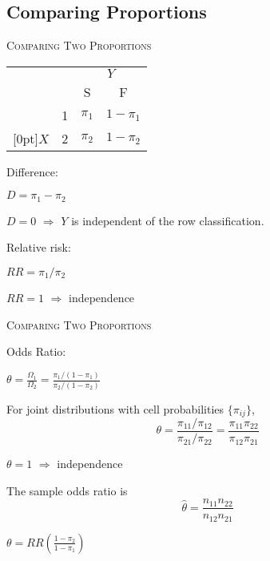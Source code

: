 \documentclass[dvipdfmx, serif,handout]{beamer}
\begin{document}
\subsection{Comparing Proportions}
\begin{frame}{\textsc{Comparing Two Proportions}}

\vspace{-.3cm}
\begin{center}
{\footnotesize
\renewcommand{\arraystretch}{.8}
\begin{tabular}{cccc|} \\
&& \multicolumn{2}{c}{$Y$} \\ 
&  & S & \multicolumn{1}{c}{F} \\ \cline{3-4}
& \multicolumn{1}{c|}{1} & $\pi_1$ & $1-\pi_1$ \\
\raisebox{1.5ex}[0pt]{$X$} & \multicolumn{1}{c|}{2} & $\pi_2$ & $1-\pi_2$ \\ \cline{3-4}
\end{tabular}
}
\end{center}
\benu
\item Difference:
\bi
\item $D=\pi_1-\pi_2$
\item $D=0$ $\Rightarrow$ $Y$ is independent of the row classification.
\ei
\item Relative risk:
\bi
\item $RR = \pi_1/\pi_2$
\item $RR=1$ $\Rightarrow$ independence
\ei
\eenu

\end{frame}
\begin{frame}{\textsc{Comparing Two Proportions}}

\benu
\item[3.] Odds Ratio:
\bi
\item $\theta = \frac{\Omega_1}{\Omega_2}=\frac{\pi_1/(1-\pi_1)}{\pi_2/(1-\pi_2)}$
\item For joint distributions with cell probabilities $\{\pi_{ij}\}$,
$$\theta=\frac{\pi_{11}/\pi_{12}}{\pi_{21}/\pi_{22}}=\frac{\pi_{11}\pi_{22}}{\pi_{12}\pi_{21}}$$
\item $\theta=1$ $\Rightarrow$ independence
\item The sample odds ratio is
$$\hat{\theta} = \frac{n_{11}n_{22}}{n_{12}n_{21}}$$
\item $\theta=RR \left(\frac{1-\pi_2}{1-\pi_1} \right)$
\ei
\eenu

\end{frame}
\end{document}
